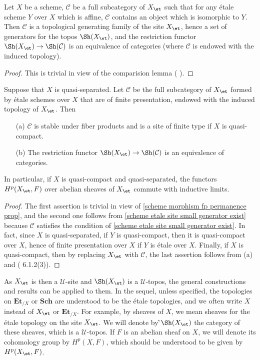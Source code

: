 \begin{proposition}\label{scheme etale site small generator exist}
Let $X$ be a scheme, $\mathcal{C}$ be a full subcategory of $X_\et$ such that for any \'etale scheme $Y$ over $X$ which is affine, $\mathcal{C}$ contains an object which is isomorphic to $Y$. Then $\mathcal{C}$ is a topological generating family of the site $X_\et$, hence a set of  generators for the topos $\Sh(X_\et)$, and the restriction functor $\Sh(X_\et)\to\Sh(\mathcal{C})$ is an equivalence of categories (where $\mathcal{C}$ is endowed with the induced topology).
\end{proposition}
\begin{proof}
This is trivial in view of the comparision lemma (\cite{SGA4-1} ).
\end{proof}

\begin{corollary}\label{scheme qs etale site of fp scheme prop}
Suppose that $X$ is quasi-separated. Let $\mathcal{C}$ be the full subcategory of $X_\et$ formed by \'etale schemes over $X$ that are of finite presentation, endowed with the induced topology of $X_\et$. Then
\begin{enumerate}
    \item[(a)] $\mathcal{C}$ is stable under fiber products and is a site of finite type if $X$ is quasi-compact.
    \item[(b)] The restriction functor $\Sh(X_\et)\to\Sh(\mathcal{C})$ is an equivalence of categories.
\end{enumerate}
In particular, if $X$ is quasi-compact and quasi-separated, the functors $H^p(X_\et,F)$ over abelian sheaves of $X_\et$ commute with inductive limits.
\end{corollary}
\begin{proof}
The first assertion is trivial in view of \cref{scheme morphism fp permanence prop}, and the second one follows from \cref{scheme etale site small generator exist} because $\mathcal{C}$ satisfies the condition of \cref{scheme etale site small generator exist}. In fact, since $X$ is quasi-separated, if $Y$ is quasi-compact, then it is quasi-compact over $X$, hence of finite presentation over $X$ if $Y$ is \'etale over $X$. Finally, if $X$ is quasi-compact, then by replacing $X_\et$ with $\mathcal{C}$, the last assertion follows from (a) and (\cite{SGA4-2}  6.1.2(3)).
\end{proof}

As $X_\et$ is then a $\mathscr{U}$-site and $\Sh(X_\et)$ is a $\mathscr{U}$-topos, the general constructions and results can be applied to them. In the sequel, unless specified, the topologies on $\mathbf{Et}_{/X}$ or $\mathbf{Sch}$ are understood to be the \'etale topologies, and we often write $X$ instead of $X_\et$ or $\mathbf{Et}_{/X}$. For example, by sheaves of $X$, we mean sheaves for the \'etale topology on the site $X_{\et}$. We will denote by ̃$\Sh(X_\et)$ the category of these sheaves, which is a $\mathscr{U}$-topos. If $F$ is an abelian sheaf on $X$, we will denote its cohomology group by $H^p(X,F)$, which should be understood to be given by $H^p(X_\et,F)$.

